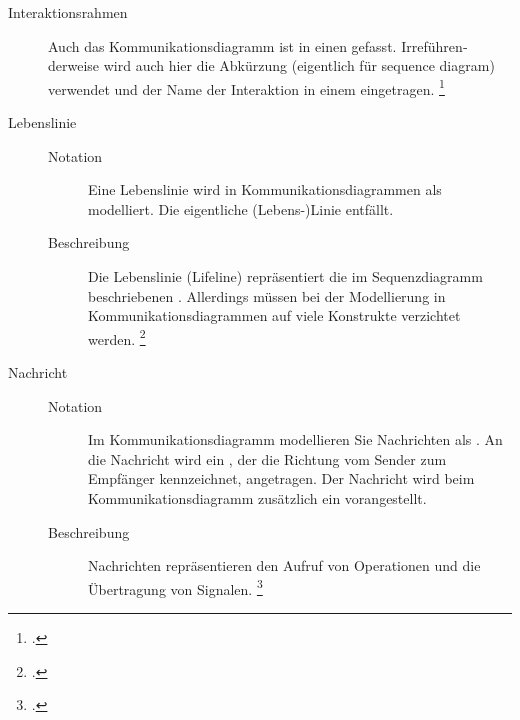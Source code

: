 \documentclass{bschlangaul-haupt}
\begin{document}
\begin{description}

%

\item[Interaktionsrahmen] Auch das Kommunikationsdiagramm ist in einen
 gefasst. Irreführen­ derweise wird auch hier
die Abkürzung  (eigentlich für sequence diagram) verwendet und
der Name der Interaktion in einem  eingetragen.
\footcite[Seite 478]{rupp}

%

\item[Lebenslinie] \strut
\begin{description}
\item[Notation] Eine Lebenslinie wird in Kommunikationsdiagrammen als
 modelliert. Die eigentliche (Lebens-)Linie
entfällt.

\item[Beschreibung] Die Lebenslinie (Lifeline) repräsentiert die im
Sequenzdiagramm beschriebenen . Allerdings
müssen bei der Modellierung in Kommunikationsdiagrammen auf viele
Konstrukte verzichtet werden.
\footcite[Seite 478]{rupp}
\end{description}

%

\item[Nachricht] \strut
\begin{description}
\item[Notation] Im Kommunikationsdiagramm modellieren Sie Nachrichten
als . An die Nachricht wird ein
, der die Richtung vom Sender zum Empfänger kennzeichnet,
angetragen. Der Nachricht wird beim Kommunikationsdiagramm zusätzlich
ein  vorangestellt.

\item[Beschreibung]
Nachrichten repräsentieren den Aufruf von Operationen und die
Übertragung von Signalen.
\footcite[Seite 480-481]{rupp}
\end{description}

\end{description}

\literatur
\end{document}
